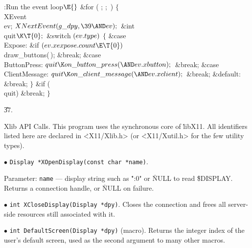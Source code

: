 \Y\B\4:Run the event loop\X${}\E{}$\6
\&{for} ( ;  ; \,)\5
${}\{{}$\1\6
\\{XEvent}\\{ev};\6
${}\\{XNextEvent}(\\{g\_dpy},\39{\AND}\\{ev});{}$\7
\&{int} \\{quit}${}\K\T{0};{}$\7
\&{switch} ${}(\\{ev}.\\{type}){}$\5
${}\{{}$\1\6
\4\&{case} \\{Expose}:\6
\&{if} ${}(\\{ev}.\\{xexpose}.\\{count}\E\T{0}){}$\1\5
\\{draw\_buttons}(\,);\2\6
\&{break};\6
\4\&{case} \\{ButtonPress}:\5
${}\\{quit}\K\\{on\_button\_press}({\AND}\\{ev}.\\{xbutton});{}$\6
\&{break};\6
\4\&{case} \\{ClientMessage}:\5
${}\\{quit}\K\\{on\_client\_message}({\AND}\\{ev}.\\{xclient});{}$\6
\&{break};\6
\4\&{default}:\5
\&{break};\6
\4${}\}{}$\2\6
\&{if} (\\{quit})\1\5
\&{break};\2\6
\4${}\}{}$\2\par
\U37.\fi

Xlib API Calls.
This program uses the synchronous core of \.{libX11}.  All identifiers
listed here are declared in \.{<X11/Xlib.h>} (or \.{<X11/Xutil.h>} for
the few utility types).

\medskip
\item{$\bullet$} {\tt Display *XOpenDisplay(const char *name)}.
\par\noindent Parameter: {\tt name} --- display string such as
\.{":0"} or \.{NULL} to read \.{\$DISPLAY}.
Returns a connection handle, or \.{NULL} on failure.

\item{$\bullet$} {\tt int XCloseDisplay(Display *dpy)}.
Closes the connection and frees all server-side resources still
associated with it.

\item{$\bullet$} {\tt int DefaultScreen(Display *dpy)} (macro).
Returns the integer index of the user's default screen, used as the
second argument to many other macros.

